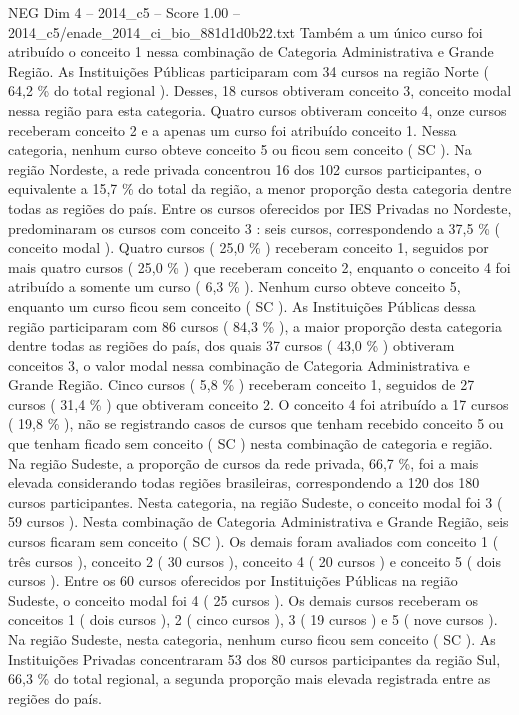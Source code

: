 \begin{textsample}{NEG Dim 4 – 2014\_c5 – Score 1.00 – 2014\_c5/enade\_2014\_ci\_bio\_881d1d0b22.txt}
Também a um único curso foi atribuído o conceito 1 nessa combinação de Categoria Administrativa e Grande Região.
As Instituições Públicas participaram com 34 cursos na região Norte ( 64,2 \% do total regional ).
Desses, 18 cursos obtiveram conceito 3, conceito modal nessa região para esta categoria.
Quatro cursos obtiveram conceito 4, onze cursos receberam conceito 2 e a apenas um curso foi atribuído conceito 1.
Nessa categoria, nenhum curso obteve conceito 5 ou ficou sem conceito ( SC ).
Na região Nordeste, a rede privada concentrou 16 dos 102 cursos participantes, o equivalente a 15,7 \% do total da região, a menor proporção desta categoria dentre todas as regiões do país.
Entre os cursos oferecidos por IES Privadas no Nordeste, predominaram os cursos com conceito 3 : seis cursos, correspondendo a 37,5 \% ( conceito modal ).
Quatro cursos ( 25,0 \% ) receberam conceito 1, seguidos por mais quatro cursos ( 25,0 \% ) que receberam conceito 2, enquanto o conceito 4 foi atribuído a somente um curso ( 6,3 \% ).
Nenhum curso obteve conceito 5, enquanto um curso ficou sem conceito ( SC ).
As Instituições Públicas dessa região participaram com 86 cursos ( 84,3 \% ), a maior proporção desta categoria dentre todas as regiões do país, dos quais 37 cursos ( 43,0 \% ) obtiveram conceitos 3, o valor modal nessa combinação de Categoria Administrativa e Grande Região.
Cinco cursos ( 5,8 \% ) receberam conceito 1, seguidos de 27 cursos ( 31,4 \% ) que obtiveram conceito 2.
O conceito 4 foi atribuído a 17 cursos ( 19,8 \% ), não se registrando casos de cursos que tenham recebido conceito 5 ou que tenham ficado sem conceito ( SC ) nesta combinação de categoria e região.
Na região Sudeste, a proporção de cursos da rede privada, 66,7 \%, foi a mais elevada considerando todas regiões brasileiras, correspondendo a 120 dos 180 cursos participantes.
Nesta categoria, na região Sudeste, o conceito modal foi 3 ( 59 cursos ).
Nesta combinação de Categoria Administrativa e Grande Região, seis cursos ficaram sem conceito ( SC ).
Os demais foram avaliados com conceito 1 ( três cursos ), conceito 2 ( 30 cursos ), conceito 4 ( 20 cursos ) e conceito 5 ( dois cursos ).
Entre os 60 cursos oferecidos por Instituições Públicas na região Sudeste, o conceito modal foi 4 ( 25 cursos ).
Os demais cursos receberam os conceitos 1 ( dois cursos ), 2 ( cinco cursos ), 3 ( 19 cursos ) e 5 ( nove cursos ).
Na região Sudeste, nesta categoria, nenhum curso ficou sem conceito ( SC ).
As Instituições Privadas concentraram 53 dos 80 cursos participantes da região Sul, 66,3 \% do total regional, a segunda proporção mais elevada registrada entre as regiões do país.

\end{textsample}
